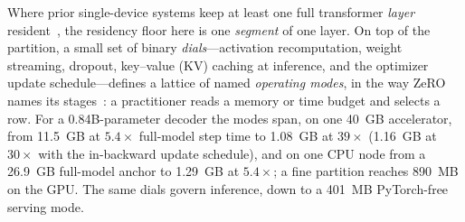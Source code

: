 \documentclass[journal]{IEEEtran}
\begin{document}
Where prior single-device systems keep at least one full transformer
\emph{layer} resident~\cite{pudipeddi2020l2l,ren2021zerooffload,sun2022stronghold,fang2023patrickstar},
the residency floor here is one \emph{segment} of one layer. On top of the
partition, a small set of binary \emph{dials}---activation recomputation,
weight streaming, dropout, key--value (KV) caching at inference, and the optimizer
update schedule---defines a lattice of named \emph{operating modes}, in the
way ZeRO names its stages~\cite{rajbhandari2020zero}: a practitioner reads a
memory or time budget and selects a row. For a 0.84B-parameter decoder the
modes span, on one 40~GB accelerator, from 11.5~GB at $5.4\times$
full-model step time to 1.08~GB at $39\times$ (1.16~GB at $30\times$ with
the in-backward update schedule), and on one CPU node from a 26.9~GB
full-model anchor to 1.29~GB at $5.4\times$; a fine partition reaches
890~MB on the GPU. The same dials govern inference, down to a 401~MB
PyTorch-free serving mode.
\end{document}

